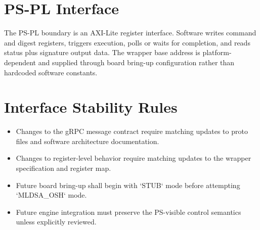 \section{PS-PL Interface}
The PS-PL boundary is an AXI-Lite register interface. Software writes command and digest registers, triggers execution, polls or waits for completion, and reads status plus signature output data. The wrapper base address is platform-dependent and supplied through board bring-up configuration rather than hardcoded software constants.

\section{Interface Stability Rules}
\begin{itemize}[leftmargin=*]
  \item Changes to the gRPC message contract require matching updates to proto files and software architecture documentation.
  \item Changes to register-level behavior require matching updates to the wrapper specification and register map.
  \item Future board bring-up shall begin with `STUB` mode before attempting `MLDSA\_OSH` mode.
  \item Future engine integration must preserve the PS-visible control semantics unless explicitly reviewed.
\end{itemize}